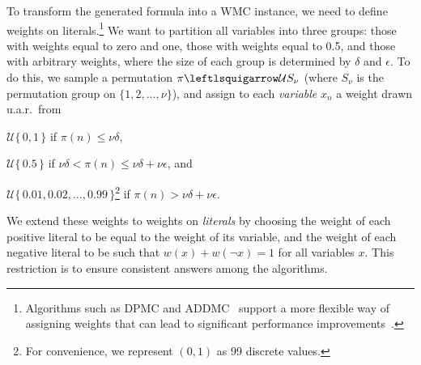 \documentclass[runningheads]{llncs}
\begin{document}
To transform the generated formula into a \textsf{WMC} instance, we need to
define weights on literals.\footnote{Algorithms such as \textsc{DPMC} and
  \textsc{ADDMC}~\cite{DBLP:conf/aaai/DudekPV20,DBLP:conf/cp/DudekPV20} support
  a more flexible way of assigning weights that can lead to significant
  performance
  improvements~\cite{DBLP:conf/uai/DilkasB21,DBLP:conf/sat/DilkasB21}.} We want
to partition all variables into three groups: those with weights equal to zero
and one, those with weights equal to 0.5, and those with arbitrary weights,
where the size of each group is determined by $\delta$ and $\epsilon$. To do
this, we sample a permutation $\pi \leftlsquigarrow \mathcal{U}S_\nu$ (where
$S_\nu$ is the permutation group on $\{1, 2, \dots, \nu \}$), and assign to each
\emph{variable} $x_n$ a weight drawn u.a.r.\ from
\begin{enumerate*}[(a)]
  \item $\mathcal{U}\{\,0, 1\,\}$ if $\pi(n) \le \nu\delta$,
  \item $\mathcal{U}\{\,0.5\,\}$ if
  $\nu\delta < \pi(n) \le \nu\delta + \nu\epsilon$, and
  \item $\mathcal{U}\{\, 0.01, 0.02, \dots, 0.99 \,\}$\footnote{For convenience,
    we represent $(0, 1)$ as 99 discrete values.} if
  $\pi(n) > \nu\delta + \nu\epsilon$.
\end{enumerate*}
We extend these weights to weights on \emph{literals} by choosing the weight of
each positive literal to be equal to the weight of its variable, and the weight
of each negative literal to be such that $w(x) + w(\neg x) = 1$ for all
variables $x$. This restriction is to ensure consistent answers among the
algorithms.
\end{document}
